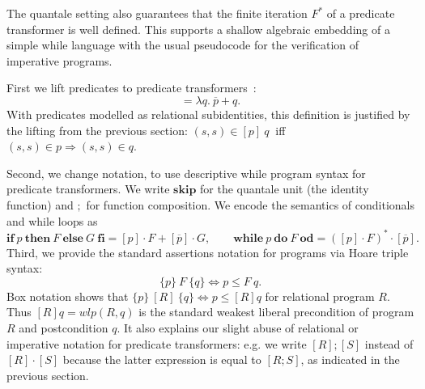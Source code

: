 \documentclass[twoside,runningheads,envcountsame,envcountsect,oribibl,orivec]{llncs}
\newcommand{\sskip}{\mathbf{skip}}
\newcommand{\iif}{\mathbf{if}}
\newcommand{\tthen}{\mathbf{then}}
\newcommand{\eelse}{\mathbf{else}}
\newcommand{\ffi}{\mathbf{fi}}
\newcommand{\wwhile}{\mathbf{while}}
\newcommand{\ddo}{\mathbf{do}}
\newcommand{\ood}{\mathbf{od}}
\newcommand{\triple}[3]{\{#1\}\ #2\ \{#3\}}
\newcommand{\ifstat}[3] {\iif \ #1 \ \tthen \ #2 \ \eelse \ #3 \ \ffi}
\newcommand{\whileloop}[2] {\wwhile \ #1 \ \ddo \ #2 \ \ood}
\newcommand{\predT}[1]{[#1]}
\begin{document}
The quantale setting also guarantees that the finite iteration
$F^\ast$ of a predicate transformer is well defined. This supports a
shallow algebraic embedding of a simple while language with the
usual pseudocode for the verification of imperative programs.

First we lift predicates to predicate transformers~\cite{BvW99-book}:
\begin{equation*}
  \predT{p} = \lambda q.\ \overline{p} + q.
\end{equation*}
With predicates modelled as relational subidentities, this definition
is justified by the lifting from the previous section: $(s, s ) \in
\predT{p}\ q\ $ iff $(s, s) \in p \Rightarrow (s, s) \in q$.

Second, we change notation, to use descriptive while program syntax
for predicate transformers. We write $\sskip$ for the quantale unit
(the identity function) and $;$ for function composition.  We encode
the semantics of conditionals and while loops as
\begin{equation*}
	\ifstat{p}{F}{G} = \predT{p}\cdot F + \predT{\overline{p}}\cdot G, \qquad 
	\whileloop{p}{F} = (\predT{p}\cdot F)^\ast\cdot\predT{\overline{p}}. 
\end{equation*}
Third, we provide the standard assertions notation for programs via
Hoare triple syntax:
\begin{equation*}
	\triple{p}{F}{q} \Leftrightarrow p \le F\ q.
\end{equation*}
Box notation shows that $\triple{p}{[R]}{q}\Leftrightarrow p\le [R]q$
for relational program $R$. Thus $[R]q=\mathit{wlp}(R,q)$ is the
standard weakest liberal precondition of program $R$ and postcondition
$q$. It also explains our slight abuse of relational or imperative
notation for predicate transformers: e.g. we write $[R];[S]$ instead
of $[R]\cdot [S]$ because the latter expression is equal to $[R;S]$,
as indicated in the previous section.
\end{document}
